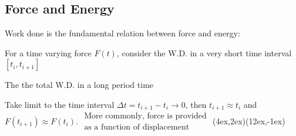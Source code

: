 \documentclass[class=article, crop=false, 12pt]{standalone}
\begin{document}
\subsection{Force and Energy}

Work done is the fundamental relation between force and energy:

For a time varying force $F(t)$, consider the W.D. in a very short time interval $[t_i, t_{i+1}]$

The the total W.D. in a long period time 

Take limit to the time interval $\Delta t = t_{i+1}-t_i \to 0$, then $t_{i+1}\approx t_i$ and $F(t_{i+1})\approx F(t_i)$.
{$\substack{\displaystyle\text{More commonly, force is provided} \\ \displaystyle\text{as a function of displacement}}$}
{(4ex,2ex)}{(12ex,-1ex)}
\end{document}
